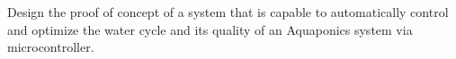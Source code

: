 Design the proof of concept of a system that is capable to automatically control and optimize the water cycle and its quality of an Aquaponics system via microcontroller.
